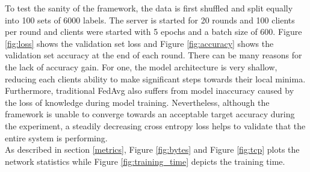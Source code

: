 \documentclass[12pt]{article}
\begin{document}
To test the sanity of the framework, the data is first shuffled and split equally into 100 sets of 6000 labels.
The server is started for 20 rounds and 100 clients per round and clients were started with 5 epochs and a batch size of 600.
Figure \ref{fig:loss} shows the validation set loss and Figure \ref{fig:accuracy} shows the
validation set accuracy at the end of each round. There can be many reasons for the lack of
accuracy gain. For one, the model architecture is very shallow, reducing each clients ability to
make significant steps towards their local minima. Furthermore, traditional FedAvg also suffers from
model inaccuracy caused by the loss of knowledge during model training\cite{hinton2015distilling}. Nevertheless, although the framework is unable to converge
towards an acceptable target accuracy during the experiment, a steadily decreasing cross entropy
loss helps to validate that the entire system is performing. \\

As described in section \ref{metrics}, Figure \ref{fig:bytes} and Figure
\ref{fig:tcp} plots the network statistics while Figure \ref{fig:training_time} depicts the training time.
\end{document}
